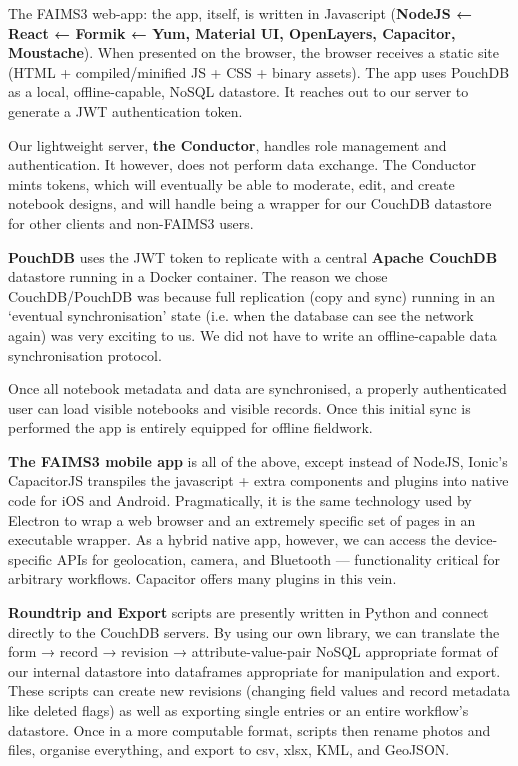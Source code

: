 \documentclass[a0,portrait]{a0poster}
\begin{document}
\begin{multicols}{3}
The FAIMS3 web-app: the app, itself, is written in Javascript (\textbf{NodeJS ← React ← Formik ← Yum, Material UI, OpenLayers, Capacitor, Moustache}). When presented on the browser, the browser receives a static site (HTML + compiled/minified JS + CSS + binary assets). The app uses PouchDB as a local, offline-capable, NoSQL datastore. It reaches out to our server to generate a JWT authentication token.

Our lightweight server, \textbf{the Conductor}, handles role management and authentication. It however, does not perform data exchange. The Conductor mints tokens, which will eventually be able to moderate, edit, and create notebook designs, and will handle being a wrapper for our CouchDB datastore for other clients and non-FAIMS3 users.

\textbf{PouchDB} uses the JWT token to replicate with a central \textbf{Apache CouchDB} datastore running in a Docker container. The reason we chose CouchDB/PouchDB was because full replication (copy and sync) running in an `eventual synchronisation' state (i.e. when the database can see the network again) was very exciting to us. We did not have to write an offline-capable data synchronisation protocol.

Once all notebook metadata and data are synchronised, a properly authenticated user can load visible notebooks and visible records. Once this initial sync is performed the app is entirely equipped for offline fieldwork.

\textbf{The FAIMS3 mobile app} is all of the above, except instead of NodeJS, Ionic’s CapacitorJS transpiles the javascript + extra components and plugins into native code for iOS and Android. Pragmatically, it is the same technology used by Electron to wrap a web browser and an extremely specific set of pages in an executable wrapper. As a hybrid native app, however, we can access the device-specific APIs for geolocation, camera, and Bluetooth — functionality critical for arbitrary workflows. Capacitor offers many plugins in this vein.



\columnbreak

\textbf{Roundtrip and Export} scripts are presently written in Python and connect directly to the CouchDB servers. By using our own library, we can translate the form → record → revision → attribute-value-pair NoSQL appropriate format of our internal datastore into dataframes appropriate for manipulation and export. These scripts can create new revisions (changing field values and record metadata like deleted flags) as well as exporting single entries or an entire workflow's datastore. Once in a more computable format, scripts then rename photos and files, organise everything, and export to csv, xlsx, KML, and GeoJSON.






\end{multicols}
\end{document}
